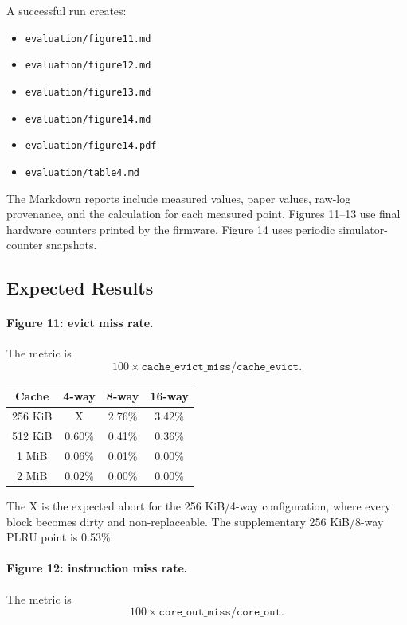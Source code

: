 \documentclass{sigplanconf}
\begin{document}
A successful run creates:

\begin{itemize}
  \item \texttt{evaluation/figure11.md}
  \item \texttt{evaluation/figure12.md}
  \item \texttt{evaluation/figure13.md}
  \item \texttt{evaluation/figure14.md}
  \item \texttt{evaluation/figure14.pdf}
  \item \texttt{evaluation/table4.md}
\end{itemize}

The Markdown reports include measured values, paper values, raw-log provenance,
and the calculation for each measured point. Figures 11--13 use final hardware
counters printed by the firmware. Figure 14 uses periodic simulator-counter
snapshots.

\subsection{Expected Results}

\paragraph{Figure 11: evict miss rate.}
The metric is
\[
100\times\mathtt{cache\_evict\_miss}/\mathtt{cache\_evict}.
\]

\begin{center}
\begin{tabular}{cccc}
\hline
Cache & 4-way & 8-way & 16-way \\
\hline
256 KiB & X & 2.76\% & 3.42\% \\
512 KiB & 0.60\% & 0.41\% & 0.36\% \\
1 MiB   & 0.06\% & 0.01\% & 0.00\% \\
2 MiB   & 0.02\% & 0.00\% & 0.00\% \\
\hline
\end{tabular}
\end{center}

The X is the expected abort for the 256 KiB/4-way configuration, where every
block becomes dirty and non-replaceable. The supplementary 256 KiB/8-way PLRU
point is 0.53\%.

\paragraph{Figure 12: instruction miss rate.}
The metric is
\[
100\times\mathtt{core\_out\_miss}/\mathtt{core\_out}.
\]
\end{document}
